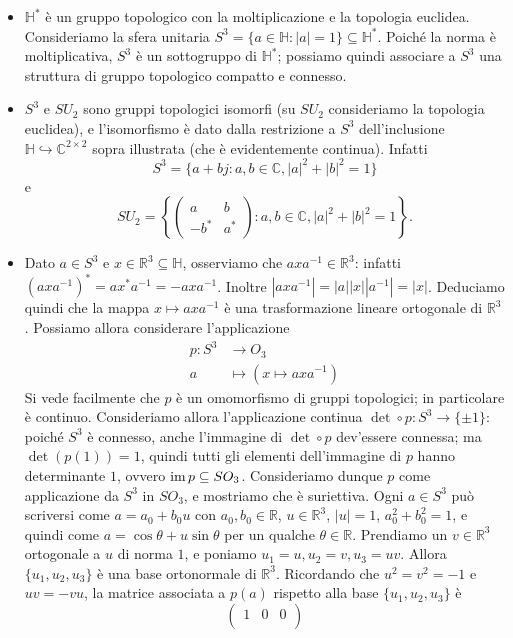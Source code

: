 \begin{itemize}
\item $\mathbb{H}^*$ è un gruppo topologico con la moltiplicazione e la topologia euclidea. Consideriamo la sfera unitaria $S^3=\{a\in\mathbb{H}:|a|=1\}\subseteq\mathbb{H}^*$. Poiché la norma è moltiplicativa, $S^3$ è un sottogruppo di $\mathbb{H}^*$; possiamo quindi associare a $S^3$ una struttura di gruppo topologico compatto e connesso.
\item $S^3$ e $SU_2$ sono gruppi topologici isomorfi (su $SU_2$ consideriamo la topologia euclidea), e l'isomorfismo è dato dalla restrizione a $S^3$ dell'inclusione $\mathbb{H}\hookrightarrow\mathbb{C}^{2\times 2}$ sopra illustrata (che è evidentemente continua). Infatti
$$
S^3=\{a+bj:a,b\in\mathbb{C},|a|^2+|b|^2=1\}
$$
e
$$
SU_2=\left\{\begin{pmatrix}a&b\\-b^*&a^*\end{pmatrix}:a,b\in\mathbb{C},|a|^2+|b|^2=1\right\}.
$$
\item Dato $a\in S^3$ e $x\in\mathbb{R}^3\subseteq\mathbb{H}$, osserviamo che $axa^{-1}\in\mathbb{R}^3$: infatti $(axa^{-1})^*=ax^*a^{-1}=-axa^{-1}$. Inoltre $|axa^{-1}|=|a||x||a^{-1}|=|x|$. Deduciamo quindi che la mappa $x\mapsto axa^{-1}$ è una trasformazione lineare ortogonale di $\mathbb{R}^3$. Possiamo allora considerare l'applicazione
\begin{align*}
p:S^3&\longrightarrow O_3\\
a&\longmapsto(x\longmapsto axa^{-1})
\end{align*}
Si vede facilmente che $p$ è un omomorfismo di gruppi topologici; in particolare è continuo. Consideriamo allora l'applicazione continua $\det\circ p:S^3\to\{\pm 1\}$: poiché $S^3$ è connesso, anche l'immagine di $\det\circ p$ dev'essere connessa; ma $\det(p(1))=1$, quindi tutti gli elementi dell'immagine di $p$ hanno determinante $1$, ovvero $\im p\subseteq SO_3$. Consideriamo dunque $p$ come applicazione da $S^3$ in $SO_3$, e mostriamo che è suriettiva. Ogni $a\in S^3$ può scriversi come $a=a_0+b_0u$ con $a_0,b_0\in\mathbb{R}$, $u\in\mathbb{R}^3$, $|u|=1$, $a_0^2+b_0^2=1$, e quindi come $a=\cos\theta+u\sin\theta$ per un qualche $\theta\in\mathbb{R}$. Prendiamo un $v\in\mathbb{R}^3$ ortogonale a $u$ di norma $1$, e poniamo $u_1=u\comma u_2=v\comma u_3=uv$. Allora $\{u_1,u_2,u_3\}$ è una base ortonormale di $\mathbb{R}^3$. Ricordando che $u^2=v^2=-1$ e $uv=-vu$, la matrice associata a $p(a)$ rispetto alla base $\{u_1,u_2,u_3\}$ è
$$
\begin{pmatrix}
1&0&0\\

\end{pmatrix}$$
\end{itemize}
